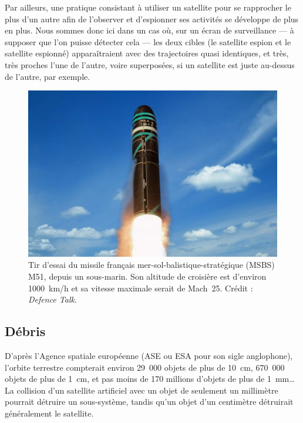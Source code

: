 	Par ailleurs, une pratique consistant à utiliser un satellite pour se rapprocher le plus d'un autre afin de l'observer et d'espionner ses activités se développe de plus en plus. Nous sommes donc ici dans un cas où, sur un écran de surveillance --- à supposer que l'on puisse détecter cela --- les deux cibles (le satellite espion et le satellite espionné) apparaîtraient avec des trajectoires quasi identiques, et très, très proches l'une de l'autre, voire superposées, si un satellite est juste au-dessus de l'autre, par exemple.
	
	
	
	\begin{figure}[H]
		\centering
		\includegraphics[width=\textwidth]{figures/ch1/m51}
		\caption[Missile mer-sol-balistique-stratégique (MSBS) français, désigné M51.]{Tir d'essai du missile français mer-sol-balistique-stratégique (MSBS) M51, depuis un sous-marin. Son altitude de croisière est d'environ 1000~km/h et sa vitesse maximale serait de Mach~25\footnotemark. Crédit : \emph{Defence Talk}\footnotemark.}
		\label{fig:m51}
	\end{figure}
	
	\addtocounter{footnote}{-1}
	\addtocounter{footnote}{1}
	
	\subsection{Débris}
	D'après l'Agence spatiale européenne (ASE ou ESA pour son sigle anglophone), l'orbite terrestre compterait environ 29~000 objets de plus de 10~cm, 670~000 objets de plus de 1~cm, et pas moins de 170 millions d'objets de plus de 1~mm\ldots{} La collision d'un satellite artificiel avec un objet de seulement un millimètre pourrait détruire un sous-système, tandis qu'un objet d'un centimètre détruirait généralement le satellite\footnotemark.
	
